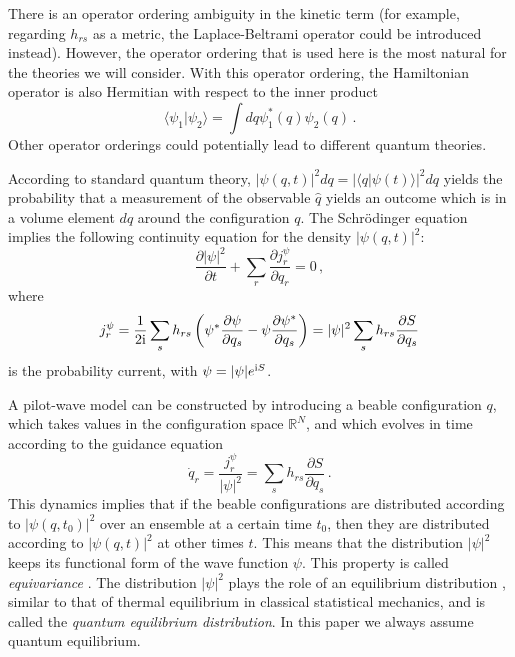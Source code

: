 \documentclass[12pt]{article}
\def\la{\langle}
\def\ra{\rangle}
\def\pa{\partial}
\def\ii{\textrm i}
\begin{document}
There is an operator ordering ambiguity in the kinetic term (for example, regarding $h_{rs}$ as a metric, the Laplace-Beltrami operator could be introduced instead). However, the operator ordering that is used here is the most natural for the theories we will consider. With this operator ordering, the Hamiltonian operator is also Hermitian with respect to the inner product
\begin{equation}
\la \psi_1 | \psi_2 \ra = \int dq \psi^*_1(q)  \psi_2 (q) \,.
\label{f.18}
\end{equation}
Other operator orderings could potentially lead to different quantum theories.

According to standard quantum theory, $|\psi(q,t)|^2 dq=|\la q| \psi (t)\ra|^2dq$ yields the probability that a measurement of the observable ${\widehat q}$ yields an outcome which is in a volume element $dq$ around the configuration $q$. The Schr{\"o}\-ding\-er equation implies the following continuity equation for the density $|\psi(q,t)|^2$:
\begin{equation}
\frac{\pa |\psi|^2 }{\pa t}  + \sum_r \frac{\partial j^\psi_r}{\partial q_r}  =0\,,
\label{f.19}
\end{equation}
where 
\begin{equation}
j^\psi_r = \frac{1}{2\ii} \sum_s  h_{rs} \left( \psi^* \frac{\partial \psi}{\partial q_s}   - \psi    \frac{\partial \psi^*}{\partial q_s}   \right)  = |\psi|^2  \sum_s  h_{rs} \frac{\partial S}{\partial q_s}  
\label{f.20}
\end{equation}
is the probability current, with $\psi=|\psi|e^{\ii S}$.

A pilot-wave model can be constructed by introducing a beable configuration $q$, which takes values in the configuration space ${\mathbb R}^N$, and which evolves in time according to the guidance equation
\begin{equation}
\dot{q}_r = \frac{j^\psi_r}{|\psi|^2} =  \sum_s  h_{rs} \frac{\partial S}{\partial q_s} \,.
\label{f.20.1}
\end{equation}
This dynamics implies that if the beable configurations are distributed according to $|\psi(q,t_0)|^2$ over an ensemble at a certain time $t_0$, then they are distributed according to $|\psi(q,t)|^2$ at other times $t$. This means that the distribution $|\psi|^2$ keeps its functional form of the wave function $\psi$. This property is called {\em equivariance} \cite{durr92}. The distribution $|\psi|^2$ plays the role of an equilibrium distribution \cite{bohm53b,valentini91a,valentini92,durr92,durr09,bohm93}, similar to that of thermal equilibrium in classical statistical mechanics, and is called the {\em quantum equilibrium distribution}. In this paper we always assume quantum equilibrium. 
\end{document}
